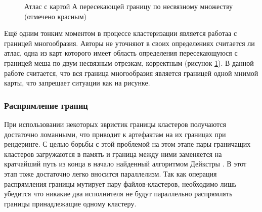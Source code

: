 \begin{figure}[ht]
\centering
{}
\caption{Атлас с картой А пересекающей границу по несвязному множеству (отмечено красным)}
\label{fig:weird_edge}
\end{figure}
Ещё одним тонким моментом в процессе кластеризации является работаа с границей многообразия. Авторы \cite{purnomo2004} не уточняют в своих определениях считается ли атлас, одна из карт которого имеет область определения пересекающуюся с границей меша по двум несвязным отрезкам, корректным (рисунок \ref{fig:weird_edge}). В данной работе считается, что вся граница многообразия является границей одной мнимой карты, что запрещает ситуации как на рисунке.

\subsubsection{Распрямление границ}
При использовании некоторых эвристик границы кластеров получаются достаточно ломанными, что приводит к артефактам на их границах при рендеринге. С целью борьбы с этой проблемой на этом этапе пары граничащих кластеров загружаются в память и граница между ними заменяется на кратчайший путь из конца в начало найденный алгоритмом Дейкстры \cite{dijkstra}. В этот этап тоже достаточно легко вносится параллелизм. Так как операция распрямления границы мутирует пару файлов-кластеров, необходимо лишь убедится что никакие два исполнителя не будут параллельно распрямлять границы принадлежащие одному кластеру.

